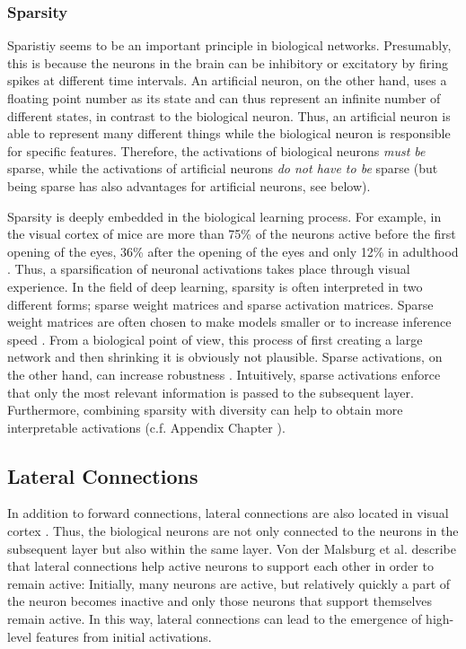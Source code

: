 \subsubsection{Sparsity}
Sparistiy seems to be an important principle in biological networks.
Presumably, this is because the neurons in the brain can be inhibitory or excitatory by firing spikes at different time intervals. An artificial neuron, on the other hand, uses a floating point number as its state and can thus represent an infinite number of different states, in contrast to the biological neuron.
Thus, an artificial neuron is able to represent many different things while the biological neuron is responsible for specific features.
Therefore, the activations of biological neurons \emph{must be} sparse, while the activations of artificial neurons \emph{do not have to be} sparse (but being sparse has also advantages for artificial neurons, see below).

Sparsity is deeply embedded in the biological learning process.
For example, in the visual cortex of mice are more than 75\% of the neurons active before the first opening of the eyes, 36\% after the opening of the eyes and only 12\% in adulthood .
Thus, a sparsification of neuronal activations takes place through visual experience.
In the field of deep learning, sparsity is often interpreted in two different forms; sparse weight matrices and sparse activation matrices.
Sparse weight matrices are often chosen to make models smaller or to increase inference speed .
From a biological point of view, this process of first creating a large network and then shrinking it is obviously not plausible.
Sparse activations, on the other hand, can increase robustness \cite{Panousis_Chatzis_Theodoridis_2021}.
Intuitively, sparse activations enforce that only the most relevant information is passed to the subsequent layer.
Furthermore, combining sparsity with diversity can help to obtain more interpretable activations (c.f. Appendix Chapter ).

\subsection{Lateral Connections}
In addition to forward connections, lateral connections are also located in visual cortex .
Thus, the biological neurons are not only connected to the neurons in the subsequent layer but also within the same layer.
Von der Malsburg et al. \cite{von_der_Malsburg_Stadelmann_Grewe_2022} describe that lateral connections help active neurons to support each other in order to remain active:
Initially, many neurons are active, but relatively quickly a part of the neuron becomes inactive and only those neurons that support themselves remain active. In this way, lateral connections can lead to the emergence of high-level features from initial activations.

